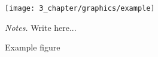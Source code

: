 \begin{figure}[htbp]
\centering
\texttt{[image: 3\_chapter/graphics/example]}
\caption{\label{fig:chapter2-example}Example figure}
\begin{flushleft}
\emph{Notes.} Write here...
\end{flushleft}
\end{figure}
